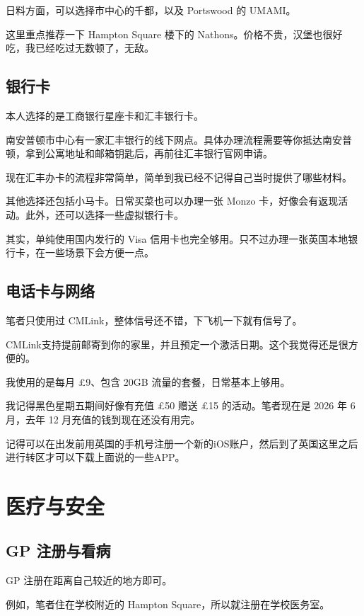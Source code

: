 \documentclass[UTF8,12pt,a4paper]{ctexart}
\begin{document}
日料方面，可以选择市中心的千都，以及 Portswood 的 UMAMI。

这里重点推荐一下 Hampton Square 楼下的 Nathons。价格不贵，汉堡也很好吃，我已经吃过无数顿了，无敌。

\subsection{银行卡}

本人选择的是工商银行星座卡和汇丰银行卡。

南安普顿市中心有一家汇丰银行的线下网点。具体办理流程需要等你抵达南安普顿，拿到公寓地址和邮箱钥匙后，再前往汇丰银行官网申请。

现在汇丰办卡的流程非常简单，简单到我已经不记得自己当时提供了哪些材料。

其他选择还包括小马卡。日常买菜也可以办理一张 Monzo 卡，好像会有返现活动。此外，还可以选择一些虚拟银行卡。

其实，单纯使用国内发行的 Visa 信用卡也完全够用。只不过办理一张英国本地银行卡，在一些场景下会方便一点。

\subsection{电话卡与网络}

笔者只使用过 CMLink，整体信号还不错，下飞机一下就有信号了。

CMLink支持提前邮寄到你的家里，并且预定一个激活日期。这个我觉得还是很方便的。

我使用的是每月 \pounds{}9、包含 20GB 流量的套餐，日常基本上够用。

我记得黑色星期五期间好像有充值 \pounds{}50 赠送 \pounds{}15 的活动。笔者现在是 2026 年 6 月，去年 12 月充值的钱到现在还没有用完。

记得可以在出发前用英国的手机号注册一个新的iOS账户，然后到了英国这里之后进行转区才可以下载上面说的一些APP。

\section{医疗与安全}

\subsection{GP 注册与看病}

GP 注册在距离自己较近的地方即可。

例如，笔者住在学校附近的 Hampton Square，所以就注册在学校医务室。
\end{document}
